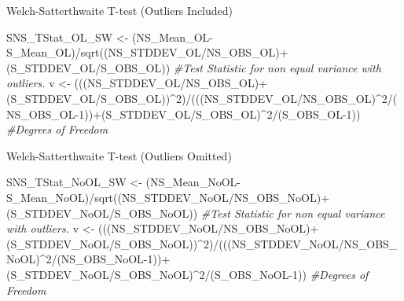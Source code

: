 \documentclass[
]{article}
\newenvironment{Shaded}{\begin{snugshade}}{\end{snugshade}}
\newcommand{\CommentTok}[1]{\textcolor[rgb]{0.56,0.35,0.01}{\textit{#1}}}
\newcommand{\DecValTok}[1]{\textcolor[rgb]{0.00,0.00,0.81}{#1}}
\newcommand{\FunctionTok}[1]{\textcolor[rgb]{0.00,0.00,0.00}{#1}}
\newcommand{\NormalTok}[1]{#1}
\newcommand{\OtherTok}[1]{\textcolor[rgb]{0.56,0.35,0.01}{#1}}
\newcommand{\SpecialCharTok}[1]{\textcolor[rgb]{0.00,0.00,0.00}{#1}}
\begin{document}
\hfill\break
Welch-Satterthwaite T-test (Outliers Included)

\begin{Shaded}
\begin{Highlighting}[]
\NormalTok{SNS\_TStat\_OL\_SW }\OtherTok{\textless{}{-}}\NormalTok{ (NS\_Mean\_OL}\SpecialCharTok{{-}}\NormalTok{S\_Mean\_OL)}\SpecialCharTok{/}\FunctionTok{sqrt}\NormalTok{((NS\_STDDEV\_OL}\SpecialCharTok{/}\NormalTok{NS\_OBS\_OL)}\SpecialCharTok{+}\NormalTok{(S\_STDDEV\_OL}\SpecialCharTok{/}\NormalTok{S\_OBS\_OL)) }\CommentTok{\#Test Statistic for non equal variance with outliers. }
\NormalTok{v }\OtherTok{\textless{}{-}}\NormalTok{ (((NS\_STDDEV\_OL}\SpecialCharTok{/}\NormalTok{NS\_OBS\_OL)}\SpecialCharTok{+}\NormalTok{(S\_STDDEV\_OL}\SpecialCharTok{/}\NormalTok{S\_OBS\_OL))}\SpecialCharTok{\^{}}\DecValTok{2}\NormalTok{)}\SpecialCharTok{/}\NormalTok{(((NS\_STDDEV\_OL}\SpecialCharTok{/}\NormalTok{NS\_OBS\_OL)}\SpecialCharTok{\^{}}\DecValTok{2}\SpecialCharTok{/}\NormalTok{(NS\_OBS\_OL}\DecValTok{{-}1}\NormalTok{))}\SpecialCharTok{+}\NormalTok{(S\_STDDEV\_OL}\SpecialCharTok{/}\NormalTok{S\_OBS\_OL)}\SpecialCharTok{\^{}}\DecValTok{2}\SpecialCharTok{/}\NormalTok{(S\_OBS\_OL}\DecValTok{{-}1}\NormalTok{)) }\CommentTok{\#Degrees of Freedom}
\end{Highlighting}
\end{Shaded}

\hfill\break
Welch-Satterthwaite T-test (Outliers Omitted)

\begin{Shaded}
\begin{Highlighting}[]
\NormalTok{SNS\_TStat\_NoOL\_SW }\OtherTok{\textless{}{-}}\NormalTok{ (NS\_Mean\_NoOL}\SpecialCharTok{{-}}\NormalTok{S\_Mean\_NoOL)}\SpecialCharTok{/}\FunctionTok{sqrt}\NormalTok{((NS\_STDDEV\_NoOL}\SpecialCharTok{/}\NormalTok{NS\_OBS\_NoOL)}\SpecialCharTok{+}\NormalTok{(S\_STDDEV\_NoOL}\SpecialCharTok{/}\NormalTok{S\_OBS\_NoOL)) }\CommentTok{\#Test Statistic for non equal variance with outliers. }
\NormalTok{v }\OtherTok{\textless{}{-}}\NormalTok{ (((NS\_STDDEV\_NoOL}\SpecialCharTok{/}\NormalTok{NS\_OBS\_NoOL)}\SpecialCharTok{+}\NormalTok{(S\_STDDEV\_NoOL}\SpecialCharTok{/}\NormalTok{S\_OBS\_NoOL))}\SpecialCharTok{\^{}}\DecValTok{2}\NormalTok{)}\SpecialCharTok{/}\NormalTok{(((NS\_STDDEV\_NoOL}\SpecialCharTok{/}\NormalTok{NS\_OBS\_NoOL)}\SpecialCharTok{\^{}}\DecValTok{2}\SpecialCharTok{/}\NormalTok{(NS\_OBS\_NoOL}\DecValTok{{-}1}\NormalTok{))}\SpecialCharTok{+}\NormalTok{(S\_STDDEV\_NoOL}\SpecialCharTok{/}\NormalTok{S\_OBS\_NoOL)}\SpecialCharTok{\^{}}\DecValTok{2}\SpecialCharTok{/}\NormalTok{(S\_OBS\_NoOL}\DecValTok{{-}1}\NormalTok{)) }\CommentTok{\#Degrees of Freedom}
\end{Highlighting}
\end{Shaded}
\end{document}
